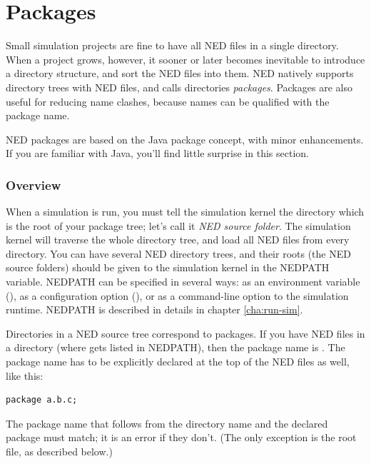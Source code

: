 \section{Packages}
\label{sec:ch-ned-lang:packages}

Small simulation projects are fine to have all NED files in a single
directory. When a project grows, however, it sooner or later becomes
inevitable to introduce a directory structure, and sort the NED files into
them. NED natively supports directory trees with NED files, and calls
directories \textit{packages}. Packages are also useful for reducing
name clashes, because names can be qualified with the package name.

\begin{note}
    NED packages are based on the Java package concept, with minor
    enhancements. If you are familiar with Java, you'll find little
    surprise in this section.
\end{note}

\subsubsection{Overview}

When a simulation is run, you must tell the simulation kernel the
directory which is the root of your package tree; let's call it
\textit{NED source folder}. The simulation kernel will traverse
the whole directory tree, and load all NED files from every directory.
You can have several NED directory trees, and their roots (the NED source
folders) should be given to the simulation kernel in the NEDPATH
variable. NEDPATH can be specified in several ways: as an environment
variable (), as a configuration option (),
or as a command-line option to the simulation runtime. NEDPATH is
described in details in chapter \ref{cha:run-sim}.

Directories in a NED source tree correspond to packages. If you have
NED files in a  directory (where 
gets listed in NEDPATH), then the package name is .
The package name has to be explicitly declared at the top of the NED
files as well, like this:

\begin{Verbatim}
package a.b.c;
\end{Verbatim}

The package name that follows from the directory name and the declared
package must match; it is an error if they don't. (The only exception
is the root  file, as described below.)

